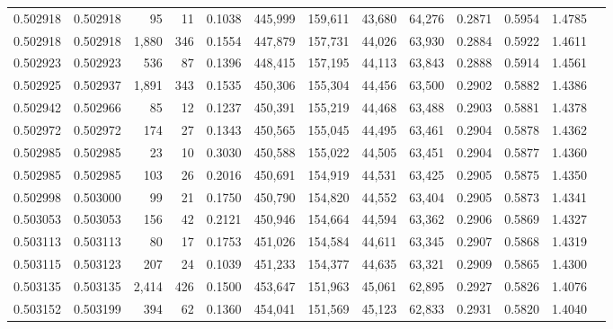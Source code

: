 \begin{tabular}{rrrrrrrrrrrrr}
0.502918 & 0.502918 &    95 &    11 &                                     0.1038 & 445,999 & 159,611 &  43,680 &  64,276 & 0.2871 & 0.5954 & 1.4785 \\
0.502918 & 0.502918 & 1,880 &   346 &                                     0.1554 & 447,879 & 157,731 &  44,026 &  63,930 & 0.2884 & 0.5922 & 1.4611 \\
0.502923 & 0.502923 &   536 &    87 &                                     0.1396 & 448,415 & 157,195 &  44,113 &  63,843 & 0.2888 & 0.5914 & 1.4561 \\
0.502925 & 0.502937 & 1,891 &   343 &                                     0.1535 & 450,306 & 155,304 &  44,456 &  63,500 & 0.2902 & 0.5882 & 1.4386 \\
0.502942 & 0.502966 &    85 &    12 &                                     0.1237 & 450,391 & 155,219 &  44,468 &  63,488 & 0.2903 & 0.5881 & 1.4378 \\
0.502972 & 0.502972 &   174 &    27 &                                     0.1343 & 450,565 & 155,045 &  44,495 &  63,461 & 0.2904 & 0.5878 & 1.4362 \\
0.502985 & 0.502985 &    23 &    10 &                                     0.3030 & 450,588 & 155,022 &  44,505 &  63,451 & 0.2904 & 0.5877 & 1.4360 \\
0.502985 & 0.502985 &   103 &    26 &                                     0.2016 & 450,691 & 154,919 &  44,531 &  63,425 & 0.2905 & 0.5875 & 1.4350 \\
0.502998 & 0.503000 &    99 &    21 &                                     0.1750 & 450,790 & 154,820 &  44,552 &  63,404 & 0.2905 & 0.5873 & 1.4341 \\
0.503053 & 0.503053 &   156 &    42 &                                     0.2121 & 450,946 & 154,664 &  44,594 &  63,362 & 0.2906 & 0.5869 & 1.4327 \\
0.503113 & 0.503113 &    80 &    17 &                                     0.1753 & 451,026 & 154,584 &  44,611 &  63,345 & 0.2907 & 0.5868 & 1.4319 \\
0.503115 & 0.503123 &   207 &    24 &                                     0.1039 & 451,233 & 154,377 &  44,635 &  63,321 & 0.2909 & 0.5865 & 1.4300 \\
0.503135 & 0.503135 & 2,414 &   426 &                                     0.1500 & 453,647 & 151,963 &  45,061 &  62,895 & 0.2927 & 0.5826 & 1.4076 \\
0.503152 & 0.503199 &   394 &    62 &                                     0.1360 & 454,041 & 151,569 &  45,123 &  62,833 & 0.2931 & 0.5820 & 1.4040 \\

\end{tabular}
